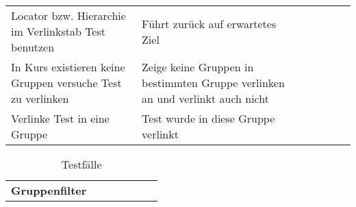 \begin{table}[]
\begin{tabular}{p{6cm}p{7cm}p{3cm}llll}
		Locator bzw. Hierarchie im Verlinkstab Test benutzen                                                                                 & Führt zurück auf erwartetes Ziel                                                                                                                                 & \checkmark           &  &  &  \\
		In Kurs existieren keine Gruppen versuche Test zu verlinken                                                                          & Zeige keine Gruppen in bestimmten Gruppe verlinken an und verlinkt auch nicht                                                                                    & \checkmark           &  &  &  \\
		Verlinke Test in eine Gruppe                                                                                                         & Test wurde in diese Gruppe verlinkt                                                                                                                              & \checkmark           &  &  &  \\
	
	\end{tabular}
\end{table}


\begin{table}[]
	\centering
	\caption{Testfälle}
	\label{my-label}
	\begin{tabular}{p{6cm}p{7cm}p{3cm}llll}
			\textbf{Gruppenfilter }                                                                                                                     &                                                                                                                                                                  &             &  &  &  \\

	\end{tabular}
\end{table}

